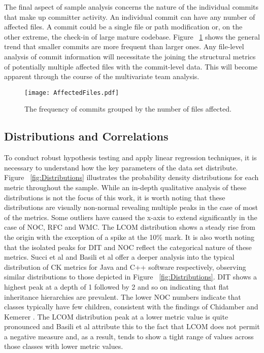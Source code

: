 The final aspect of sample analysis concerns the nature of the individual commits that make up committer activity. An individual commit can have any number of affected files. A commit could be a single file or path modification or, on the other extreme, the check-in of large mature codebase. Figure ~\ref{fig:AffectedFiles} shows the general trend that smaller commits are more frequent than larger ones. Any file-level analysis of commit information will necessitate the joining the structural metrics of potentially multiple affected files with the commit-level data. This will become apparent through the course of the multivariate team analysis.

\begin{figure}[htbp!] 
\centering    
\texttt{[image: AffectedFiles.pdf]}
\caption{The frequency of commits grouped by the number of files affected.}
\label{fig:AffectedFiles}
\end{figure}

\subsection{Distributions and Correlations}
To conduct robust hypothesis testing and apply linear regression techniques, it is necessary to understand how the key parameters of the data set distribute. Figure ~\ref{fig:Distributions} illustrates the probability density distributions for each metric throughout the sample. While an in-depth qualitative analysis of these distributions is not the focus of this work, it is worth noting that these distributions are visually non-normal revealing multiple peaks in the case of most of the metrics. Some outliers have caused the x-axis to extend significantly in the case of NOC, RFC and WMC. The LCOM distribution shows a steady rise from the origin with the exception of a spike at the 10\% mark. It is also worth noting that the isolated peaks for DIT and NOC reflect the categorical nature of these metrics. Succi et al \citep{succi2005empirical} and Basili et al \citep{basili1996validation} offer a deeper analysis into the typical distribution of CK metrics for Java and C++ software respectively, observing similar distributions to those depicted in Figure ~\ref{fig:Distributions}. DIT shows a highest peak at a depth of 1 followed by 2 and so on indicating that flat inheritance hierarchies are prevalent. The lower NOC numbers indicate that classes typically have few children, consistent with the findings of Chidamber and Kemerer \citep{chidamber1994metrics}. The LCOM distribution peak at a lower metric value is quite pronounced and Basili et al attribute this to the fact that LCOM does not permit a negative measure and, as a result, tends to show a tight range of values across those classes with lower metric values.

